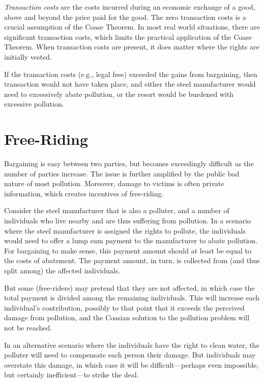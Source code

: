 \documentclass[
]{book}
\begin{document}
\emph{Transaction costs} are the costs incurred during an economic exchange of a good, above and beyond the price paid for the good. The zero transaction costs is a crucial assumption of the Coase Theorem. In most real world situations, there are significant transaction costs, which limits the practical application of the Coase Theorem. When transaction costs are present, it does matter where the rights are initially vested.

If the transaction costs (e.g., legal fees) exceeded the gains from bargaining, then transaction would not have taken place, and either the steel manufacturer would need to excessively abate pollution, or the resort would be burdened with excessive pollution.

\hypertarget{free-riding}{%
\section{Free-Riding}\label{free-riding}}

Bargaining is easy between two parties, but becomes exceedingly difficult as the number of parties increase. The issue is further amplified by the public bad nature of most pollution. Moreover, damage to victims is often private information, which creates incentives of free-riding.

Consider the steel manufacturer that is also a polluter, and a number of individuals who live nearby and are thus suffering from pollution. In a scenario where the steel manufacturer is assigned the rights to pollute, the individuals would need to offer a lump sum payment to the manufacturer to abate pollution. For bargaining to make sense, this payment amount should at least be equal to the costs of abatement. The payment amount, in turn, is collected from (and thus split among) the affected individuals.

But some (free-riders) may pretend that they are not affected, in which case the total payment is divided among the remaining individuals. This will increase each individual's contribution, possibly to that point that it exceeds the perceived damage from pollution, and the Coasian solution to the pollution problem will not be reached.

In an alternative scenario where the individuals have the right to clean water, the polluter will need to compensate each person their damage. But individuals may overstate this damage, in which case it will be difficult---perhaps even impossible, but certainly inefficient---to strike the deal.
\end{document}
